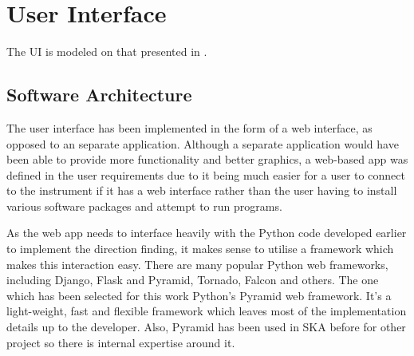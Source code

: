 \chapter{User Interface}
\label{ch:user-interface}

The UI is modeled on that presented in \cite{guerin2012passive}.

\section{Software Architecture}
The user interface has been implemented in the form of a web interface, as opposed to an separate application. Although a separate application would have been able to provide more functionality and better graphics, a web-based app was defined in the user requirements due to it being much easier for a user to connect to the instrument if it has a web interface rather than the user having to install various software packages and attempt to run programs.

As the web app needs to interface heavily with the Python code developed earlier to implement the direction finding, it makes sense to utilise a framework which makes this interaction easy. There are many popular Python web frameworks, including Django, Flask and Pyramid, Tornado, Falcon and others. The one which has been selected for this work Python's Pyramid web framework. It's a light-weight, fast and flexible framework which leaves most of the implementation details up to the developer. Also, Pyramid has been used in SKA before for other project so there is internal expertise around it. 



